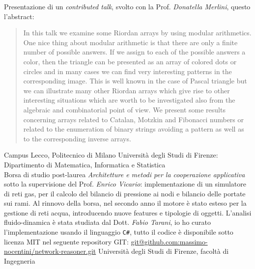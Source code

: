\documentclass[totpages,openbib,italian]{europecv}
\begin{document}


\begin{europecv}
\ecvpersonalinfo[20pt]



{Presentazione di un \emph{contributed talk}, svolto con la Prof. \emph{Donatella Merlini}, questo l'abstract:
\begin{quote}
In this talk we examine some Riordan arrays by using modular arithmetics. 
One nice thing about modular arithmetic is that there are only a finite number of possible answers.
If we assign to each of the possible answers a color, then the triangle can be 
presented as an array of colored dots or circles and in many cases we can find 
very interesting patterns in the corresponding image. This is well known in the case of 
Pascal triangle but we can illustrate many other Riordan arrays which give rise to 
other interesting situations which are worth to be investigated also from the 
algebraic and combinatorial point of view. We present some results concerning 
arrays related to Catalan, Motzkin and Fibonacci numbers or related to the 
enumeration of binary strings avoiding a pattern as well as to the corresponding inverse arrays.
\end{quote}}
{Campus Lecco, Politecnico di Milano}
{Universit\`a degli Studi di Firenze: Dipartimento di Matematica, Informatica e Statistica}
\\
{Borsa di studio post-laurea \emph{Architetture e metodi
 per la cooperazione applicativa} sotto la supervisione del
 Prof. \emph{Enrico Vicario}: implementazione di un simulatore
 di reti gas, per il calcolo del bilancio di pressione ai nodi
 e bilancio delle portate sui rami. Al rinnovo della borsa,
 nel secondo anno il motore \`e stato esteso per la gestione
 di reti acqua, introducendo nuove features e tipologie di oggetti.
 L'analisi fluido-dinamica \`e stata studiata dal Dott. \emph{Fabio Tarani}, 
 io ho curato l'implementazione usando il linguaggio \texttt{C\#},
 tutto il codice \`e disponibile sotto licenza MIT nel seguente
 repository GIT: \url{git@github.com:massimo-nocentini/network-reasoner.git} }
{Universit\`a degli Studi di Firenze, facolt\`a di Ingegneria}


\end{europecv}
\end{document}
